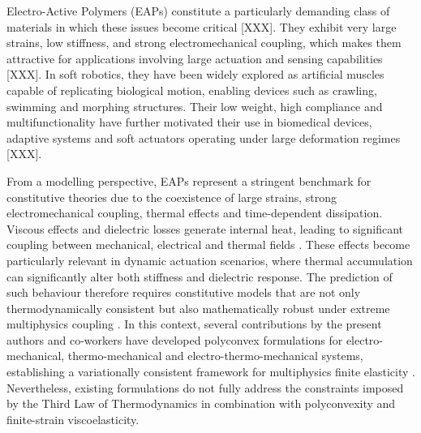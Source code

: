 Electro-Active Polymers (EAPs) constitute a particularly demanding class of materials in which these issues become critical [XXX]. They exhibit very large strains, low stiffness, and strong electromechanical coupling, which makes them attractive for applications involving large actuation and sensing capabilities [XXX]. In soft robotics, they have been widely explored as artificial muscles capable of replicating biological motion, enabling devices such as crawling, swimming and morphing structures. Their low weight, high compliance and multifunctionality have further motivated their use in biomedical devices, adaptive systems and soft actuators operating under large deformation regimes [XXX].

From a modelling perspective, EAPs represent a stringent benchmark for constitutive theories due to the coexistence of large strains, strong electromechanical coupling, thermal effects and time-dependent dissipation. Viscous effects and dielectric losses generate internal heat, leading to significant coupling between mechanical, electrical and thermal fields \cite{Reese_Govindjee_1998}. These effects become particularly relevant in dynamic actuation scenarios, where thermal accumulation can significantly alter both stiffness and dielectric response. The prediction of such behaviour therefore requires constitutive models that are not only thermodynamically consistent but also mathematically robust under extreme multiphysics coupling \cite{Bonet_polyconvexity_2015}. In this context, several contributions by the present authors and co-workers have developed polyconvex formulations for electro-mechanical, thermo-mechanical and electro-thermo-mechanical systems, establishing a variationally consistent framework for multiphysics finite elasticity \cite{Bonet_polyconvexity_2015,Bonet_cross_product_2016,Bonet2021first}. Nevertheless, existing formulations do not fully address the constraints imposed by the Third Law of Thermodynamics in combination with polyconvexity and finite-strain viscoelasticity.

